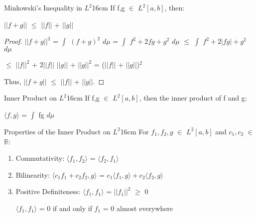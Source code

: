     \vspace{0.5cm}



    \begin{wtheorem}{Minkowski's Inequality in $L^2$}{16cm}
        If f,g $\in$ $L^2[a,b]$, then:

        \hspace{0.5cm}
        $||f+g||$ $\leq$ $||f||$ + $||g||$
    \end{wtheorem}

    \begin{proof}
        $||f+g||^2$
        = $\int$ $(f+g)^2$ $d\mu$
        = $\int$ $f^2 + 2fg + g^2$ $d\mu$
        $\leq$ $\int$ $f^2 + 2|fg| + g^2$ $d\mu$

        \hspace{1.6cm}
        $\leq$ $||f||^2$ + $2||f||$ $||g||$ + $||g||^2$
        = ($||f||$ + $||g||$)$^2$
        
        Thus, $||f+g||$ $\leq$ $||f||$ + $||g||$.
    \end{proof}

    \vspace{0.5cm}



    \begin{definition}{Inner Product on $L^2$}{16cm}
        If f,g $\in$ $L^2[a,b]$, then the {\color{lblue} inner product}
        of f and g:

        \hspace{0.5cm}
        $\langle f,g \rangle$ = $\int$ fg $d\mu$
    \end{definition}

    \vspace{0.5cm}



    \begin{wtheorem}{Properties of the Inner Product on $L^2$}{16cm}
        For $f_1,f_2,g$ $\in$ $L^2[a,b]$ and $c_1,c_2$ $\in$ $\mathbb{R}$:
    \end{wtheorem}

    \begin{enumerate}[label=(\alph*), leftmargin=2cm, itemsep=0.1cm]
        \item {\color{lgreen} Commutativity}:
            $\langle f_1,f_2 \rangle$ = $\langle f_2,f_1 \rangle$

        \item {\color{lgreen} Bilinearity}:
            $\langle c_1f_1 + c_2f_2 , g \rangle$
            = $c_1 \langle f_1,g \rangle + c_2 \langle f_2,g \rangle$

        \item {\color{lgreen} Positive Definiteness}:
            $\langle f_1,f_1 \rangle$ = $||f_1||^2$ $\geq$ 0

            $\langle f_1,f_1 \rangle$ = 0 if and only if $f_1$ = 0 almost everywhere
    \end{enumerate}

